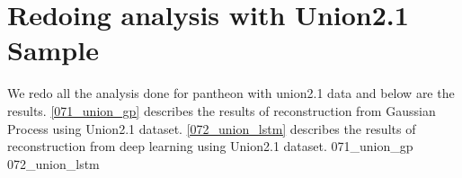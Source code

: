 \section{Redoing analysis with Union2.1 Sample}
\label{results_gp_union}
We redo all the analysis done for pantheon with union2.1 data and below are the results. \ref{071_union_gp} describes the results of reconstruction from Gaussian Process using Union2.1 dataset. \ref{072_union_lstm} describes the results of reconstruction from deep learning using Union2.1 dataset.
{071_union_gp}
{072_union_lstm}